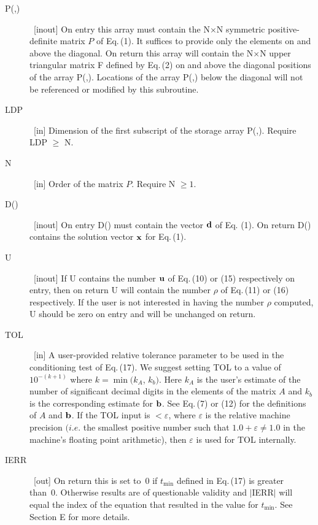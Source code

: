 \documentclass[twoside]{MATH77}
\begin{document}
\begin{description}
\item[P(,)]  \ [inout] On entry this array must contain the N$\times $N
symmetric positive-definite matrix $P$ of Eq.\,(1). It suffices to provide only
the elements on and above the diagonal. On return this array will contain the
N$\times $N upper triangular matrix F defined by Eq.\,(2) on and above the diagonal
positions of the array P(,). Locations of the array P(,) below the diagonal
will not be referenced or modified by this subroutine.

\item[LDP]  \ [in] Dimension of the first subscript of the storage array
P(,). Require LDP $\geq $ N.

\item[N]  \ [in] Order of the matrix $P$. Require N $\geq 1.$

\item[D()]  \ [inout] On entry D() must contain the vector ${\bf d}$ of Eq.
(1). On return D() contains the solution vector ${\bf x}$ for Eq.\,(1).

\item[U]  \ [inout] If U contains the number ${\bf u}$ of Eq.\,(10) or (15)
respectively on entry, then on return U will contain the number $\rho $ of
Eq.\,(11) or (16) respectively. If the user is not interested in having the
number $\rho $ computed, U should be zero on entry and will be unchanged on
return.

\item[TOL]  \ [in] A user-provided relative tolerance parameter to be used
in the conditioning test of Eq.\,(17). We suggest setting TOL to a value of $%
10^{-(k+1)}$ where $k=\min (k_A$, $k_b)$. Here $k_A$ is the user's estimate
of the number of significant decimal digits in the elements of the matrix $A$
and $k_b$ is the corresponding estimate for ${\bf b}$. See Eq.\,(7) or (12)
for the definitions of $A$ and ${\bf b}$. If the TOL input is $<\varepsilon $,
where $\varepsilon $ is the relative machine precision $(i.e$. the smallest
positive number such that $1.0+\varepsilon \neq 1.0$ in the machine's
floating point arithmetic), then $\varepsilon $ is used for TOL internally.

\item[IERR]  \ [out] On return this is set to~0 if $t_{\min }$ defined in
Eq.\,(17) is greater than~0. Otherwise results are of
questionable validity and $|$IERR$|$ will equal the index of the equation
that resulted in the value for $t_{\min }$. See Section E for more details.
\end{description}
\end{document}
